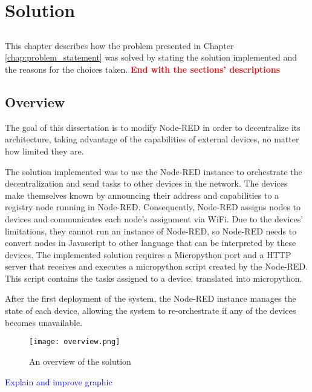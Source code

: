 \chapter{Solution} \label{chap:solution} \minitoc

\section*{}

This chapter describes how the problem presented in Chapter \ref{chap:problem_statement} was solved by stating the solution implemented and the reasons for the choices taken.  \textbf{\textcolor{red}{End with the sections' descriptions}}

\section{Overview}\label{sec:solution_overview}

The goal of this dissertation is to modify Node-RED in order to decentralize its architecture, taking advantage of the capabilities of external devices, no matter how limited they are.

The solution implemented was to use the Node-RED instance to orchestrate the decentralization and send tasks to other devices in the network. The devices make themselves known by announcing their address and capabilities to a registry node running in Node-RED. Consequently, Node-RED assigns nodes to devices and communicates each node's assignment via WiFi. Due to the devices' limitations, they cannot run an instance of Node-RED, so Node-RED needs to convert nodes in Javascript to other language that can be interpreted by these devices. The implemented solution requires a Micropython port and a HTTP server that receives and executes a micropython script created by the Node-RED. This script contains the tasks assigned to a device, translated into micropython. 

After the first deployment of the system, the Node-RED instance manages the state of each device, allowing the system to re-orchestrate if any of the devices becomes unavailable.

\begin{figure}[h]
\centering
\texttt{[image: overview.png]}
\caption[Solution's overview]{An overview of the solution}\label{fig:solution_overview}
\end{figure}

\textcolor{blue}{Explain and improve graphic}


